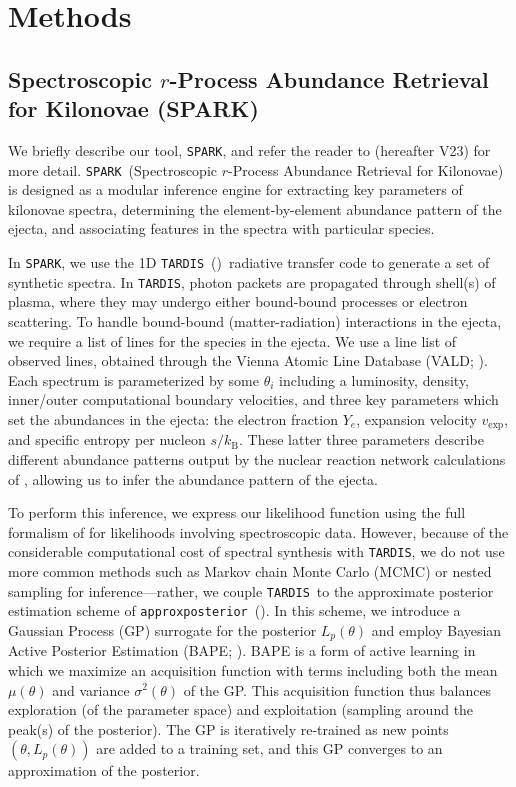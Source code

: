 \documentclass[twocolumn,twocolappendix]{aastex63}
\def\SPARK{\texttt{SPARK}}
\def\TARDIS{\texttt{TARDIS}}
\def\approxposterior{\texttt{approxposterior}}
\begin{document}

\section{Methods}\label{sec:methods}

\subsection{Spectroscopic $r$-Process Abundance Retrieval for Kilonovae (\textsc{SPARK})}\label{ssc:spark-summary}

We briefly describe our tool, \SPARK, and refer the reader to \cite{vieira23} (hereafter V23) for more detail. \SPARK~(Spectroscopic $r$-Process Abundance Retrieval for Kilonovae) is designed as a modular inference engine for extracting key parameters of kilonovae spectra, determining the element-by-element abundance pattern of the ejecta, and associating features in the spectra with particular species. 

In \SPARK, we use the 1D \TARDIS~(\citealt{kerzendorf14, kerzendorf23})~radiative transfer code to generate a set of synthetic spectra. In \TARDIS, photon packets are propagated through shell(s) of plasma, where they may undergo either bound-bound processes or electron scattering. To handle bound-bound (matter-radiation) interactions in the ejecta, we require a list of lines for the species in the ejecta. We use a line list of observed lines, obtained through the Vienna Atomic Line Database (VALD; \citealt{ryabchikova15, pakhomov19}). Each spectrum is parameterized by some $\theta_i$ including a luminosity, density, inner/outer computational boundary velocities, and three key parameters which set the abundances in the ejecta: the electron fraction $Y_e$, expansion velocity $v_{\mathrm{exp}}$, and specific entropy per nucleon $s / k_{\mathrm{B}}$. These latter three parameters describe different abundance patterns output by the nuclear reaction network calculations of \cite{wanajo18}, allowing us to infer the abundance pattern of the ejecta.  

To perform this inference, we express our likelihood function using the full formalism of \cite{czekala15} for likelihoods involving spectroscopic data. However, because of the considerable computational cost of spectral synthesis with \TARDIS, we do not use more common methods such as Markov chain Monte Carlo (MCMC) or nested sampling for inference---rather, we couple \TARDIS~to the approximate posterior estimation scheme of \approxposterior~(\citealt{fleming18,fleming20}). In this scheme, we introduce a Gaussian Process (GP) surrogate for the posterior $L_p (\theta)$ and employ Bayesian Active Posterior Estimation (BAPE; \citealt{kandasamy17}). BAPE is a form of active learning in which we maximize an acquisition function with terms including both the mean $\mu(\theta)$ and variance $\sigma^2(\theta)$ of the GP. This acquisition function thus balances exploration (of the parameter space) and exploitation (sampling around the peak(s) of the posterior). The GP is iteratively re-trained as new points $(\theta, L_p(\theta))$ are added to a training set, and this GP converges to an approximation of the posterior. 
\end{document}
